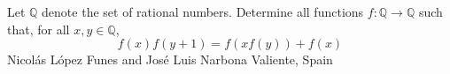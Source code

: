 Let $\mathbb{Q}$ denote the set of rational numbers. Determine all functions $f:\mathbb{Q}\longrightarrow\mathbb{Q}$ such that, for all $x, y \in \mathbb{Q}$,  $$f(x)f(y+1)=f(xf(y))+f(x)$$Nicolás López Funes and José Luis Narbona Valiente, Spain